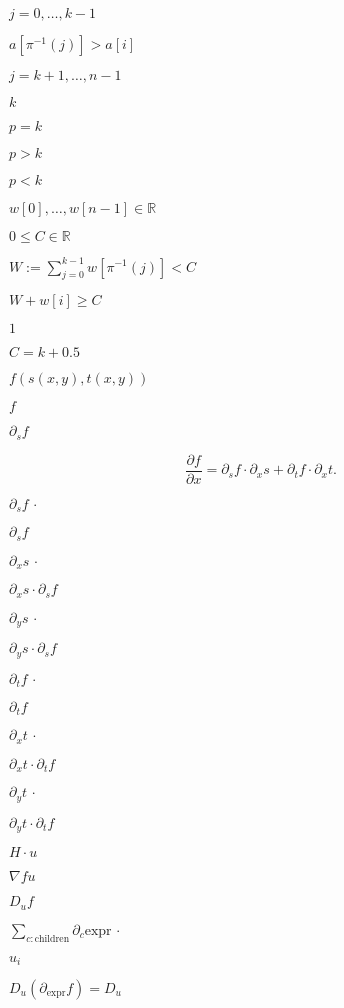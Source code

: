 \documentclass{article}
\begin{document}
$ j = 0, \dots, k-1  $
\pagebreak

$ a[\pi^{-1}(j)] > a[i]  $
\pagebreak

$ j = k + 1,\dots,n - 1 $
\pagebreak

$ k  $
\pagebreak

$ p = k $
\pagebreak

$ p > k $
\pagebreak

$ p < k $
\pagebreak

$ w[0], \dots, w[n-1] \in \mathbb{R}$
\pagebreak

$ 0 \leq C \in \mathbb{R} $
\pagebreak

$ W:= \sum_{j = 0}^{k - 1}w[\pi^{-1}(j)] < C$
\pagebreak

$ W + w[i] \geq C$
\pagebreak

$ 1 $
\pagebreak

$ C = k + 0.5$
\pagebreak

$f(s(x,y),t(x,y))$
\pagebreak

$f$
\pagebreak

$ \partial_sf $
\pagebreak

\[ \frac{\partial f}{\partial x} = \partial_s f \cdot \partial_x s + \partial_t f \cdot \partial_x t. \]
\pagebreak

$\partial_s f \,\cdot$
\pagebreak

$\partial_s f$
\pagebreak

$\partial_x s \,\cdot$
\pagebreak

$\partial_x s \cdot \partial_s f$
\pagebreak

$\partial_y s \,\cdot$
\pagebreak

$\partial_y s \cdot \partial_s f$
\pagebreak

$\partial_t f \,\cdot$
\pagebreak

$\partial_t f$
\pagebreak

$\partial_x t \,\cdot$
\pagebreak

$\partial_x t \cdot \partial_t f$
\pagebreak

$\partial_y t \,\cdot$
\pagebreak

$\partial_y t \cdot \partial_t f$
\pagebreak

$H\cdot u$
\pagebreak

$\nabla f u$
\pagebreak

$D_u f$
\pagebreak

$\sum_{c:\text{children}} \partial_c \text{expr} \,\cdot$
\pagebreak

$u_i$
\pagebreak

$D_u (\partial_{\text{expr}} f) = D_u$
\pagebreak
\end{document}
